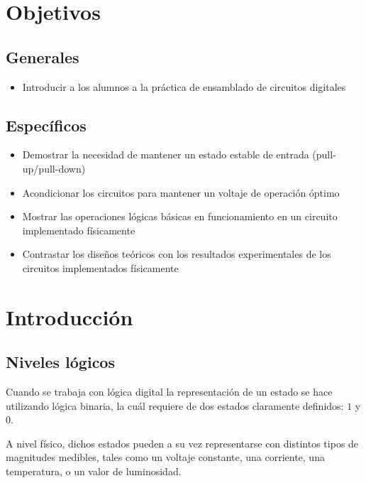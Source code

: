 
\section*{Objetivos}
\subsection*{Generales}
\begin{itemize}
    \item Introducir a los alumnos a la práctica de ensamblado de circuitos digitales
\end{itemize}

\subsection*{Específicos}
\begin{itemize}
    \item Demostrar la necesidad de mantener un estado estable de entrada (pull-up/pull-down)
    \item Acondicionar los circuitos para mantener un voltaje de operación óptimo
    \item Mostrar las operaciones lógicas básicas en funcionamiento en un circuito implementado físicamente
    \item Contrastar los diseños teóricos con los resultados experimentales de los circuitos implementados físicamente
\end{itemize}

\section{Introducción}
\subsection{Niveles lógicos}
Cuando se trabaja con lógica digital la representación de un estado se hace utilizando lógica binaria, la cuál requiere
de dos estados claramente definidos: $1$ y $0$.

A nivel físico, dichos estados pueden a su vez representarse con distintos tipos de magnitudes medibles, tales como 
un voltaje constante, una corriente, una temperatura, o un valor de luminosidad.

